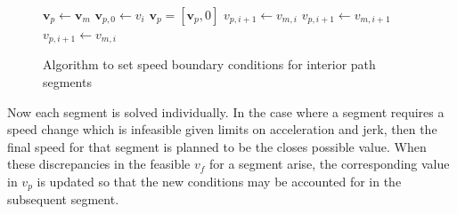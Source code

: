 \documentclass[letterpaper, 10 pt, conference]{ieeeconf}  %
\begin{document}
\begin{figure}
  \begin{algorithmic}[1]
      \State $\mathbf{v}_p \gets \mathbf{v}_m$ 
      \State $\mathbf{v}_{p,0} \gets v_i$ 
      \State $\mathbf{v}_p = [\mathbf{v}_p, 0]$ 
          \State $v_{p,i+1} \gets v_{m,i}$
          \State $v_{p,i+1} \gets v_{m,i+1}$
        \Else
          \State $v_{p,i+1} \gets v_{m,i}$
        \EndIf
      \EndFor
    \EndProcedure
  \end{algorithmic}
\caption{Algorithm to set speed boundary conditions for interior path segments}
\label{alg:segmentspeedboundaryconditions}
\end{figure}

Now each segment is solved individually.
In the case where a segment requires a speed change which is infeasible given limits on acceleration and jerk, then the final speed for that segment is planned to be the closes possible value.
When these discrepancies in the feasible $v_f$ for a segment arise, the corresponding value in $v_p$ is updated so that the new conditions may be accounted for in the subsequent segment.
\end{document}
